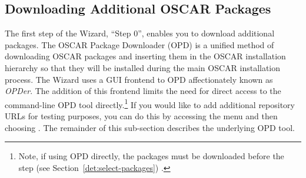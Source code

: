 
\subsection{Downloading Additional OSCAR Packages}
\label{det:opd}

\optional

The first step of the Wizard, ``Step 0'', enables you to download
additional packages. The OSCAR Package Downloader (OPD) is a unified
method of downloading OSCAR packages and inserting them in the OSCAR
installation hierarchy so that they will be installed during the
main OSCAR installation process.  The Wizard uses a GUI frontend to
OPD affectionately known as \emph{OPDer}.  The addition of this
frontend limits the need for direct access to the command-line OPD
tool directly.\footnote{Note, if using OPD directly, the packages
must be downloaded before the  step (see Section~\ref{det:select-packages}) .} If you
would like to add additional repository URLs for testing purposes,
you can do this by accessing the  menu and then
choosing . The remainder of this
sub-section describes the underlying OPD tool.


